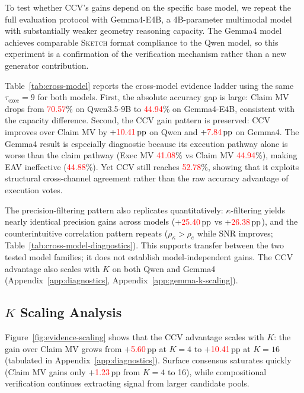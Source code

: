 \documentclass{article}
\newcommand{\sketch}{\textsc{Sketch}}
\newcommand{\ccv}{\textsc{CCV}}
\newcommand{\pp}{\,\text{pp}}
\newcommand{\recheck}[1]{\textcolor{red}{#1}}
\begin{document}
To test whether \ccv{}'s gains depend on the specific base model, we repeat the full evaluation protocol with Gemma4-E4B, a 4B-parameter multimodal model with substantially weaker geometry reasoning capacity. The Gemma4 model achieves comparable \sketch{} format compliance to the Qwen model, so this experiment is a confirmation of the verification mechanism rather than a new generator contribution.

Table~\ref{tab:cross-model} reports the cross-model evidence ladder using the same $\tau_{\text{exec}}{=}9$ for both models. First, the absolute accuracy gap is large: Claim MV drops from \recheck{70.57}\% on Qwen3.5-9B to \recheck{44.94}\% on Gemma4-E4B, consistent with the capacity difference. Second, the \ccv{} gain pattern is preserved: \ccv{} improves over Claim MV by $+\recheck{10.41}\pp$ on Qwen and $+\recheck{7.84}\pp$ on Gemma4. The Gemma4 result is especially diagnostic because its execution pathway alone is worse than the claim pathway (Exec MV \recheck{41.08}\% vs Claim MV \recheck{44.94}\%), making EAV ineffective (\recheck{44.88}\%). Yet \ccv{} still reaches \recheck{52.78}\%, showing that it exploits structural cross-channel agreement rather than the raw accuracy advantage of execution votes.

The precision-filtering pattern also replicates quantitatively: $\kappa$-filtering yields nearly identical precision gains across models ($+\recheck{25.40}\pp$ vs $+\recheck{26.38}\pp$), and the counterintuitive correlation pattern repeats ($\rho_\kappa>\rho_e$ while SNR improves; Table~\ref{tab:cross-model-diagnostics}). This supports transfer between the two tested model families; it does not establish model-independent gains. The \ccv{} advantage also scales with $K$ on both Qwen and Gemma4 (Appendix~\ref{app:diagnostics}, Appendix~\ref{app:gemma-k-scaling}).

\subsection{$K$ Scaling Analysis}

Figure~\ref{fig:evidence-scaling} shows that the \ccv{} advantage scales with $K$: the gain over Claim MV grows from $+$\recheck{5.60}$\pp$ at $K{=}4$ to $+$\recheck{10.41}$\pp$ at $K{=}16$ (tabulated in Appendix~\ref{app:diagnostics}). Surface consensus saturates quickly (Claim MV gains only $+$\recheck{1.23}$\pp$ from $K{=}4$ to 16), while compositional verification continues extracting signal from larger candidate pools.
\end{document}
